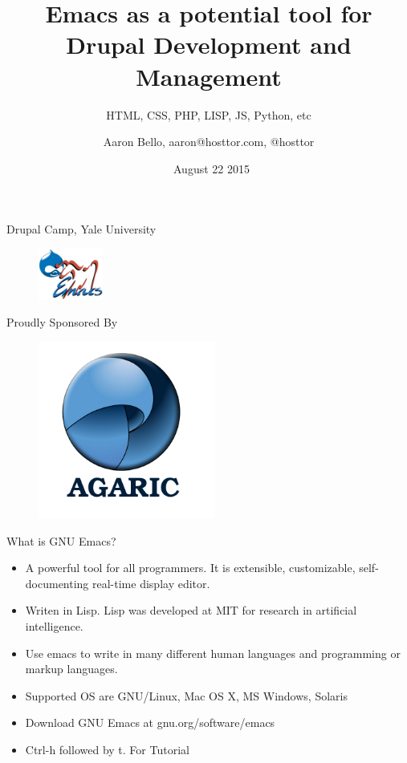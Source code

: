 \documentclass[english,12pt,presentation]{beamer}
\title{Emacs as a potential tool for Drupal Development and Management}
\subtitle{HTML, CSS, PHP, LISP, JS, Python, etc}
\author{Aaron Bello, aaron@hosttor.com, @hosttor}
\date{\ August 22 2015}
\begin{document}
\begin{frame}{Drupal Camp, Yale University}
\begin{figure}
\centering
\includegraphics[width=80]{images/logo.png}
\end{figure}
\titlepage
\end{frame}

\begin{frame}{Proudly Sponsored By}
\begin{figure}
\centering
\includegraphics[width=220]{images/agaric.png}
\end{figure}
\end{frame}

\begin{frame}{What is GNU Emacs?}
\begin{itemize}
\pause \item A powerful tool for all programmers. It is extensible, customizable, self-documenting real-time display editor. 
\pause \item Writen in Lisp. Lisp was developed at MIT for research in artificial intelligence. 
\pause \item Use emacs to write in many different human languages and programming or markup languages.
\pause \item Supported OS are GNU/Linux, Mac OS X, MS Windows, Solaris
\pause \item Download GNU Emacs at gnu.org/software/emacs
\pause \item Ctrl-h followed by t. For Tutorial
\end{itemize}
\end{frame}
\end{document}
